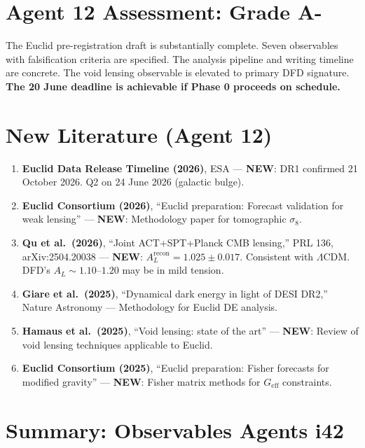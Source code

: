 \documentclass[11pt,a4paper]{article}
\newcommand{\NEW}{\textcolor{dfdblue}{\textbf{NEW}}}
\begin{document}
\section{Agent 12 Assessment: Grade A-}

The Euclid pre-registration draft is substantially complete. Seven observables with falsification criteria are specified. The analysis pipeline and writing timeline are concrete. The void lensing observable is elevated to primary DFD signature. \textbf{The 20 June deadline is achievable if Phase 0 proceeds on schedule.}

\section{New Literature (Agent 12)}

\begin{enumerate}
\item \textbf{Euclid Data Release Timeline (2026)}, ESA --- \NEW: DR1 confirmed 21 October 2026. Q2 on 24 June 2026 (galactic bulge).

\item \textbf{Euclid Consortium (2026)}, ``Euclid preparation: Forecast validation for weak lensing'' --- \NEW: Methodology paper for tomographic $\sigma_8$.

\item \textbf{Qu et al.\ (2026)}, ``Joint ACT+SPT+Planck CMB lensing,'' PRL 136, arXiv:2504.20038 --- \NEW: $A_L^{\text{recon}} = 1.025 \pm 0.017$. Consistent with $\Lambda$CDM. DFD's $A_L \sim 1.10$--$1.20$ may be in mild tension.

\item \textbf{Giare et al.\ (2025)}, ``Dynamical dark energy in light of DESI DR2,'' Nature Astronomy --- Methodology for Euclid DE analysis.

\item \textbf{Hamaus et al.\ (2025)}, ``Void lensing: state of the art'' --- \NEW: Review of void lensing techniques applicable to Euclid.

\item \textbf{Euclid Consortium (2025)}, ``Euclid preparation: Fisher forecasts for modified gravity'' --- \NEW: Fisher matrix methods for $G_{\mathrm{eff}}$ constraints.
\end{enumerate}


\section*{Summary: Observables Agents i42}
\end{document}
